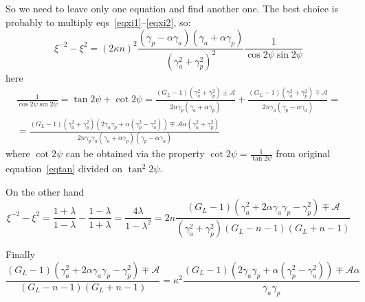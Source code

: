 \documentclass[12pt, notitlepage]{report}
\begin{document}
So we need to leave only one equation and find another one. The best choice is probably to multiply eqs~\eqref{eqxi1}--\eqref{eqxi2}, so:
\begin{equation}
	\xi^{-2} - \xi^2 = \left(2\kappa n\right)^2\frac{(\gamma_p - \alpha\gamma_a)(\gamma_a + \alpha\gamma_p)}{\left(\gamma_a^2 + \gamma_p^2\right)^2}\frac{1}{\cos2\psi\sin2\psi}
\end{equation}
here
\begin{multline}
	\frac{1}{\cos2\psi\sin2\psi} = \tan2\psi + \cot2\psi = \frac{(G_L-1)(\gamma_a^2 + \gamma_p^2) \pm \mathcal{A}}{2n\gamma_p(\gamma_a+\alpha\gamma_p)}+ \frac{(G_L-1)(\gamma_a^2 + \gamma_p^2) \mp \mathcal{A}}{2n\gamma_a(\gamma_p-\alpha\gamma_a)} = \\
	=\frac{(G_L-1)(\gamma_a^2 + \gamma_p^2)(2\gamma_a\gamma_p + \alpha(\gamma_p^2-\gamma_a^2)) \mp \mathcal{A}\alpha\left( \gamma_a^2 + \gamma_p^2 \right)}{2n\gamma_p\gamma_a(\gamma_a+\alpha\gamma_p)(\gamma_p-\alpha\gamma_a)}
\end{multline}
where $\cot2\psi$ can be obtained via the property $\cot2\psi = \frac{1}{\tan2\psi}$ from original equation~\eqref{eqtan} divided on $\tan^2 2\psi$.

On the other hand
\begin{equation}
	\xi^{-2} - \xi^2 = \frac{1+\lambda}{1-\lambda} - \frac{1-\lambda}{1+\lambda} = \frac{4\lambda}{1-\lambda^2} = 2n\frac{(G_L-1)(\gamma_a^2+2\alpha\gamma_a\gamma_p-\gamma_p^2)\mp\mathcal{A}}{\left(\gamma_a^2+\gamma_p^2\right)\left(G_L-n-1\right)\left(G_L+n-1\right)}
\end{equation}

Finally
\begin{equation}
\frac{(G_L-1)(\gamma_a^2+2\alpha\gamma_a\gamma_p-\gamma_p^2)\mp\mathcal{A}}{\left(G_L-n-1\right)\left(G_L+n-1\right)} = 
\kappa^2 \frac{(G_L-1)(2\gamma_a\gamma_p + \alpha(\gamma_p^2-\gamma_a^2)) \mp \mathcal{A}\alpha}{\gamma_a\gamma_p}
\end{equation}

\newpage{}
\end{document}
